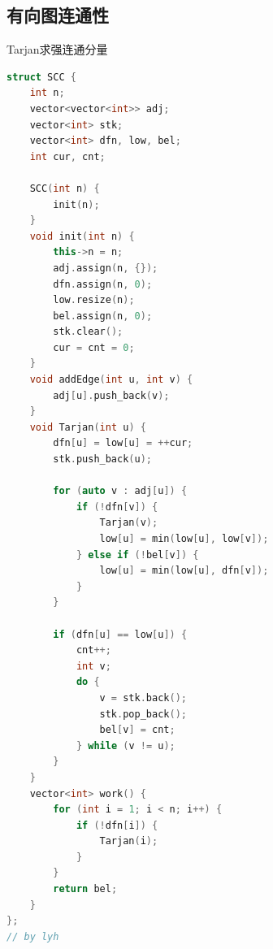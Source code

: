 \subsection{有向图连通性}

Tarjan求强连通分量
\begin{lstlisting}[language=C++]
struct SCC {
    int n;
    vector<vector<int>> adj;
    vector<int> stk;
    vector<int> dfn, low, bel;
    int cur, cnt;
    
    SCC(int n) {
        init(n);
    }
    void init(int n) {
        this->n = n;
        adj.assign(n, {});
        dfn.assign(n, 0);
        low.resize(n);
        bel.assign(n, 0);
        stk.clear();
        cur = cnt = 0;
    }
    void addEdge(int u, int v) {
        adj[u].push_back(v);
    }
    void Tarjan(int u) {
        dfn[u] = low[u] = ++cur;
        stk.push_back(u);
        
        for (auto v : adj[u]) {
            if (!dfn[v]) {
                Tarjan(v);
                low[u] = min(low[u], low[v]);
            } else if (!bel[v]) {
                low[u] = min(low[u], dfn[v]);
            }
        }
        
        if (dfn[u] == low[u]) {
            cnt++;
            int v;
            do {
                v = stk.back();
                stk.pop_back();
                bel[v] = cnt;
            } while (v != u);
        }
    }
    vector<int> work() {
        for (int i = 1; i < n; i++) {
            if (!dfn[i]) {
                Tarjan(i);
            }
        }
        return bel;
    }
};
// by lyh
\end{lstlisting}

